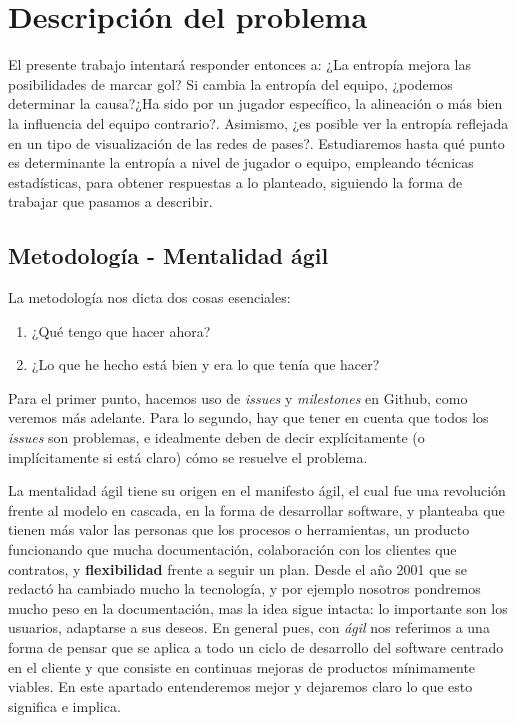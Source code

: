 \chapter{Descripción del problema}
El presente trabajo intentará responder entonces a: ¿La entropía mejora las posibilidades 
de marcar gol? Si cambia la entropía del equipo, ¿podemos determinar la causa?¿Ha sido por un jugador 
específico, la alineación o más bien la influencia del equipo 
contrario?. Asimismo, ¿es posible ver la entropía reflejada en un tipo de visualización de 
las redes de pases?. Estudiaremos hasta qué punto es determinante la 
entropía a nivel de jugador o equipo, empleando técnicas estadísticas, para obtener respuestas a lo planteado, 
siguiendo la forma de trabajar que pasamos a describir.

\section{Metodología - Mentalidad ágil}
La metodología nos dicta dos cosas esenciales:
\begin{enumerate}
    \item ¿Qué tengo que hacer ahora?
    \item ¿Lo que he hecho está bien y era lo que tenía que hacer?
\end{enumerate}

Para el primer punto, hacemos uso de \textit{issues} y \textit{milestones} en Github, 
como veremos más adelante. Para lo segundo, hay que tener en cuenta que todos 
los \textit{issues} son problemas, e idealmente deben de decir explícitamente 
(o implícitamente si está claro) cómo se resuelve el problema.

La mentalidad ágil tiene su origen en el manifesto ágil\cite{manifiesto-agil}, el cual fue una revolución frente 
al modelo en cascada,
en la forma de desarrollar software, y planteaba que tienen más valor las personas que 
los procesos o herramientas, un producto funcionando que mucha documentación, colaboración 
con los clientes que contratos, y \textbf{flexibilidad} frente a seguir un plan. Desde el 
año 2001 que se redactó ha cambiado mucho la tecnología, y por ejemplo nosotros pondremos 
mucho peso en la documentación, mas la idea sigue intacta: lo importante son los usuarios, 
adaptarse a sus deseos. En general pues, con \textit{ágil} nos referimos a una forma de pensar que se aplica 
a todo un ciclo de desarrollo del software centrado en el cliente y que consiste en 
continuas mejoras de productos mínimamente viables\cite{agile-science}.
En este apartado entenderemos mejor y dejaremos claro lo que esto significa e implica.

